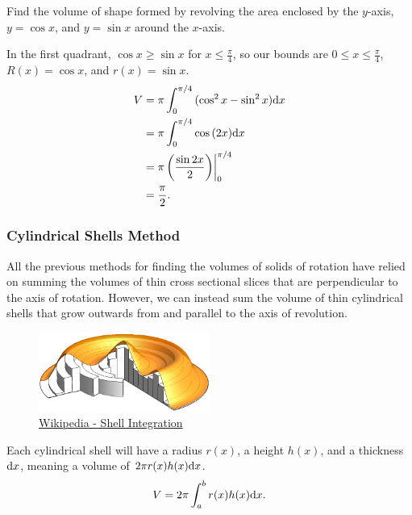 \begin{example}
	Find the volume of shape formed by revolving the area enclosed by the $y$-axis, $y=\cos{x}$, and $y=\sin{x}$ around the $x$-axis.
\end{example}
In the first quadrant, $\cos{x} \geq \sin{x}$ for $x \leq \frac{\pi}{4}$, so our bounds are $0 \leq x \leq \frac{\pi}{4}$, $R(x)=\cos{x}$, and $r(x)=\sin{x}$.
\begin{align*}
	V &= \pi\int_{0}^{\pi/4}{(\cos^2{x}-\sin^2{x})\mathrm{d} x} \\
	&= \pi\int_{0}^{\pi/4}{\cos{(2x)}\mathrm{d} x} \\
	&= \pi\left(\frac{\sin{2x}}{2}\right)\biggr\rvert_0^{\pi/4} \\
	&= \frac{\pi}{2}.
\end{align*}

\subsubsection{Cylindrical Shells Method}
All the previous methods for finding the volumes of solids of rotation have relied on summing the volumes of thin cross sectional slices that are perpendicular to the axis of rotation.
However, we can instead sum the volume of thin cylindrical shells that grow outwards from and parallel to the axis of revolution.

\begin{figure}[H]
	\label{shells}
	\centering
	\includegraphics[width=0.5\textwidth]{./applications_integrals/shells.png}
	\caption{\hyperref{https://en.wikipedia.org/wiki/Shell\_integration}{}{}{Wikipedia - Shell Integration}}
\end{figure}

\noindent
Each cylindrical shell will have a radius $r(x)$, a height $h(x)$, and a thickness $\mathrm{d} x$, meaning a volume of $2\pi r(x)h(x)\mathrm{d} x$.
\begin{equation*}
	V = 2\pi\int_{a}^{b}{r(x)h(x)\mathrm{d} x}.
\end{equation*}

